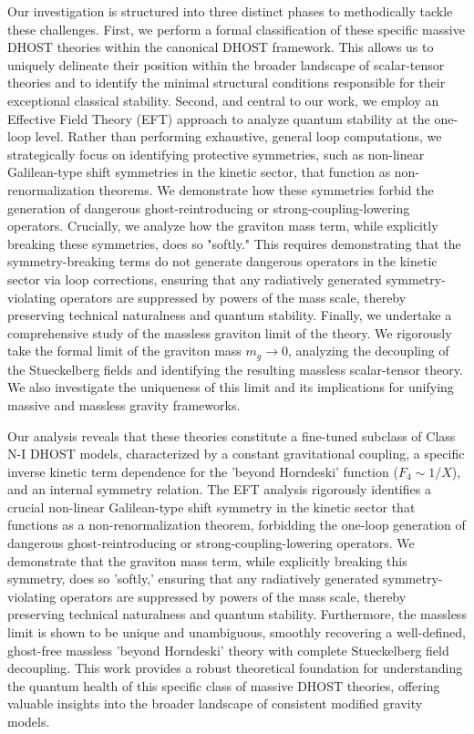 \documentclass[twocolumn]{aastex631}
\begin{document}
Our investigation is structured into three distinct phases to methodically tackle these challenges. First, we perform a formal classification of these specific massive DHOST theories within the canonical DHOST framework. This allows us to uniquely delineate their position within the broader landscape of scalar-tensor theories and to identify the minimal structural conditions responsible for their exceptional classical stability. Second, and central to our work, we employ an Effective Field Theory (EFT) approach to analyze quantum stability at the one-loop level. Rather than performing exhaustive, general loop computations, we strategically focus on identifying protective symmetries, such as non-linear Galilean-type shift symmetries in the kinetic sector, that function as non-renormalization theorems. We demonstrate how these symmetries forbid the generation of dangerous ghost-reintroducing or strong-coupling-lowering operators. Crucially, we analyze how the graviton mass term, while explicitly breaking these symmetries, does so "softly." This requires demonstrating that the symmetry-breaking terms do not generate dangerous operators in the kinetic sector via loop corrections, ensuring that any radiatively generated symmetry-violating operators are suppressed by powers of the mass scale, thereby preserving technical naturalness and quantum stability. Finally, we undertake a comprehensive study of the massless graviton limit of the theory. We rigorously take the formal limit of the graviton mass $m_g \to 0$, analyzing the decoupling of the Stueckelberg fields and identifying the resulting massless scalar-tensor theory. We also investigate the uniqueness of this limit and its implications for unifying massive and massless gravity frameworks.

Our analysis reveals that these theories constitute a fine-tuned subclass of Class N-I DHOST models, characterized by a constant gravitational coupling, a specific inverse kinetic term dependence for the 'beyond Horndeski' function ($F_4 \sim 1/X$), and an internal symmetry relation. The EFT analysis rigorously identifies a crucial non-linear Galilean-type shift symmetry in the kinetic sector that functions as a non-renormalization theorem, forbidding the one-loop generation of dangerous ghost-reintroducing or strong-coupling-lowering operators. We demonstrate that the graviton mass term, while explicitly breaking this symmetry, does so 'softly,' ensuring that any radiatively generated symmetry-violating operators are suppressed by powers of the mass scale, thereby preserving technical naturalness and quantum stability. Furthermore, the massless limit is shown to be unique and unambiguous, smoothly recovering a well-defined, ghost-free massless 'beyond Horndeski' theory with complete Stueckelberg field decoupling. This work provides a robust theoretical foundation for understanding the quantum health of this specific class of massive DHOST theories, offering valuable insights into the broader landscape of consistent modified gravity models.
\end{document}

